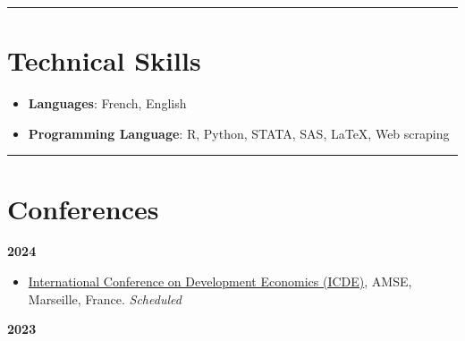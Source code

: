 \documentclass[
]{article}
\providecommand{\tightlist}{%
  \setlength{\itemsep}{0pt}\setlength{\parskip}{0pt}}
\begin{document}
\begin{center}\rule{0.5\linewidth}{0.5pt}\end{center}

\section{Technical Skills}\label{technical-skills}

\begin{itemize}
\tightlist
\item
  \textbf{Languages}: French, English
\item
  \textbf{Programming Language}: R, Python, STATA, SAS, LaTeX, Web
  scraping
\end{itemize}

\begin{center}\rule{0.5\linewidth}{0.5pt}\end{center}

\section{Conferences}\label{conferences}

\textbf{2024}

\begin{itemize}
\tightlist
\item
  \href{https://icde2024.sciencesconf.org/}{International Conference on
  Development Economics (ICDE)}, AMSE, Marseille, France.
  \emph{Scheduled}
\end{itemize}

\textbf{2023}
\end{document}
